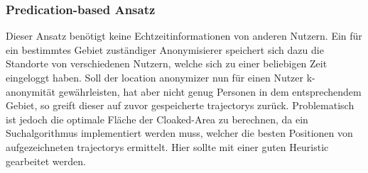 \subsubsection{Predication-based Ansatz} 
Dieser Ansatz benötigt keine Echtzeitinformationen von anderen Nutzern. Ein für ein bestimmtes Gebiet zuständiger Anonymisierer speichert sich dazu die Standorte von verschiedenen Nutzern, welche sich zu einer beliebigen Zeit eingeloggt haben. Soll der location anonymizer nun für einen Nutzer k-anonymität gewährleisten, hat aber nicht genug Personen in dem entsprechendem Gebiet, so greift dieser auf zuvor gespeicherte trajectorys zurück. Problematisch ist jedoch die optimale Fläche der Cloaked-Area zu berechnen, da ein Suchalgorithmus implementiert werden muss, welcher die besten Positionen von aufgezeichneten trajectorys ermittelt. Hier sollte mit einer guten Heuristic gearbeitet werden. 
